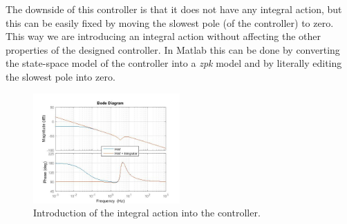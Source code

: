   \begin{figure}[h]
  \centering
  \hfill
  \caption{}
\end{figure}

The downside of this controller is that it does not have any integral action, but this can be easily fixed by moving the slowest pole (of the controller) to zero. This way we are introducing an integral action without affecting the other properties of the designed controller. In Matlab this can be done by converting the state-space model of the controller into a \emph{zpk} model and by literally editing the slowest pole into zero.\\

\begin{figure}[h]
\centering
\includegraphics[width=0.5\textwidth]{img/hinf_integrator.jpg}
\caption{Introduction of the integral action into the controller.}
\end{figure}


